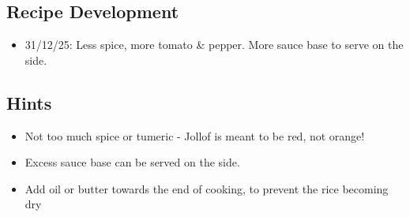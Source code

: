 \subsection*{Recipe Development}
\begin{itemize}
    \item 31/12/25: Less spice, more tomato \& pepper. More sauce base to serve on the side.
\end{itemize}

\subsection*{Hints}
\begin{itemize}
    \item Not too much spice or tumeric - Jollof is meant to be red, not orange!
    \item Excess sauce base can be served on the side.
    \item Add oil or butter towards the end of cooking, to prevent the rice becoming dry
\end{itemize}
\newpage